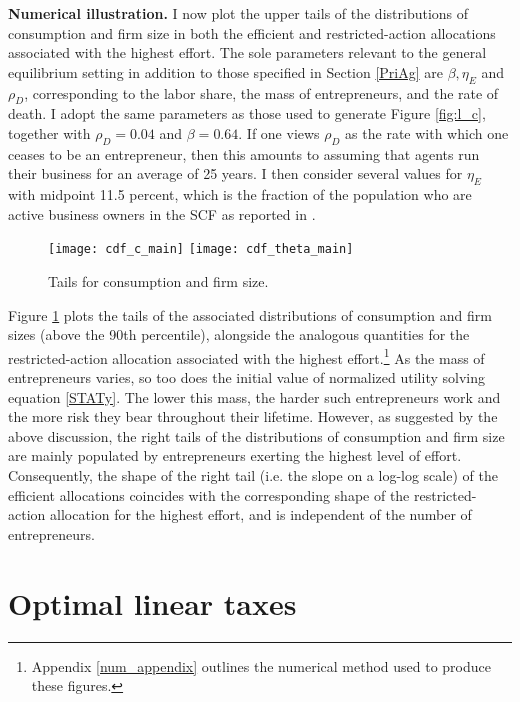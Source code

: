 \documentclass[11pt]{article}
\theoremstyle{plain}
\newcommand{\betaval}{0.64}
\begin{document}
\textbf{Numerical illustration.} I now plot the upper tails of the distributions of consumption and firm size in both the efficient and restricted-action allocations associated with the highest effort. The sole parameters relevant to the general equilibrium setting in addition to those specified in Section \ref{PriAg} are $\beta, \eta_E$ and $\rho_D$, corresponding to the labor share, the mass of entrepreneurs, and the rate of death. I adopt the same parameters as those used to generate Figure \ref{fig:l_c}, together with $\rho_D = 0.04$ and $\beta = \betaval$. If one views $\rho_D$ as the rate with which one ceases to be an entrepreneur, then this amounts to assuming that agents run their business for an average of 25 years. I then consider several values for $\eta_E$ with midpoint 11.5 percent, which is the fraction of the population who are active business owners in the SCF as reported in \cite{cagetti_entrepreneurship_2006}. 

\begin{figure}[!htb]
\centering
\texttt{[image: cdf\_c\_main]}
\texttt{[image: cdf\_theta\_main]}
\caption{Tails for consumption and firm size.}\label{fig:tails_dist}
\end{figure}

Figure \ref{fig:tails_dist} plots the tails of the associated distributions of consumption and firm sizes (above the 90th percentile), alongside the analogous quantities for the restricted-action allocation associated with the highest effort.\footnote{Appendix \ref{num_appendix} outlines the numerical method used to produce these figures.} As the mass of entrepreneurs varies, so too does the initial value of normalized utility solving equation \eqref{STATy}. The lower this mass, the harder such entrepreneurs work and the more risk they bear throughout their lifetime. However, as suggested by the above discussion, the right tails of the distributions of consumption and firm size are mainly populated by entrepreneurs exerting the highest level of effort. Consequently, the shape of the right tail (i.e. the slope on a log-log scale) of the efficient allocations coincides with the corresponding shape of the restricted-action allocation for the highest effort, and is independent of the number of entrepreneurs. 

\section{Optimal linear taxes} \label{Imp}
\end{document}
